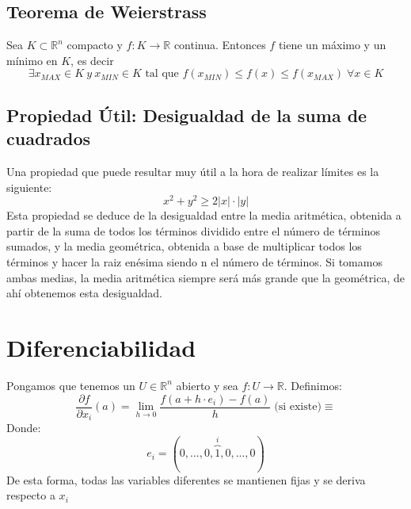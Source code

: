 \documentclass[11pt]{article}
\providecommand{\abs}[1]{\left\lvert #1\right\rvert}
\providecommand{\abs}[1]{\left\lvert #1\right\rvert}
\newcommand{\R}{\mathbb{R}}
\theoremstyle{plain}
\begin{document}
        \subsection{Teorema de Weierstrass} %
        \label{sub:teorema_de_weierstrass}
            Sea $K\subset \R^n$ compacto y $f:K\rightarrow \R$ continua. Entonces $f$ tiene un máximo y un mínimo en $K$, es decir
            \begin{equation}
                 \exists x_{MAX} \in K \ y \ x_{MIN} \in K \text{ tal que } f(x_{MIN})\le f(x) \le f(x_{MAX}) \; \forall x \in K
             \end{equation} 
        
        \subsection{Propiedad Útil: Desigualdad de la suma de cuadrados} %
        \label{sub:propiedad_útil_desigualdad_de_la_suma_de_cuadrados}
            Una propiedad que puede resultar muy útil a la hora de realizar límites es la siguiente:
            \begin{equation}
                x^2 + y^2 \ge 2\abs{x}\cdot\abs{y}
            \end{equation}
            Esta propiedad se deduce de la desigualdad entre la media aritmética, obtenida a partir de la suma de todos los términos dividido entre el número de términos sumados, y la media geométrica, obtenida a base de multiplicar todos los términos y hacer la raiz enésima siendo n el número de términos. Si tomamos ambas medias, la media aritmética siempre será más grande que la geométrica, de ahí obtenemos esta desigualdad.
    \section{Diferenciabilidad} %
    \label{sec:diferenciabilidad}
        Pongamos que tenemos un $U \in \R^n$ abierto y sea $f:U \rightarrow \R$. Definimos:
        \begin{equation}
            \frac{\partial f}{\partial x_i} (a) = \lim_{h\to 0} \frac{f(a +h\cdot e_i) - f(a)}{h} \; \text{(si existe)} \equiv 
        \end{equation}
        Donde: \[e_i = (0,...,0,\overbrace{1}^{i},0,...,0)\]
        De esta forma, todas las variables diferentes se mantienen fijas y se deriva respecto a $x_i$
\end{document}
